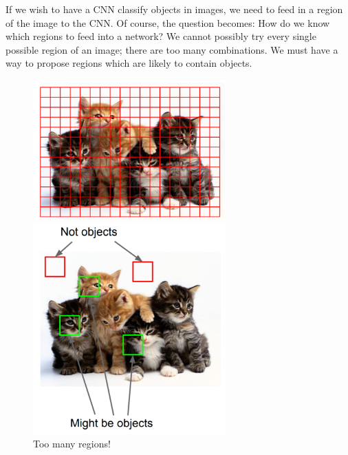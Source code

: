 \documentclass{article}
\begin{document}
If we wish to have a CNN classify objects in images, we need to feed in a region of the image to the CNN. Of course, the question becomes: How do we know which regions to feed into a network? We cannot possibly try every single possible region of an image; there are too many combinations. We must have a way to propose regions which are likely to contain objects.

\begin{figure}[htbp]
    \centering
    \begin{minipage}{0.45\textwidth}
        \centering
        \includegraphics[width=0.66\textwidth]{search.PNG} %
        \caption{Too many regions!}
    \end{minipage}\hfill
    \begin{minipage}{0.45\textwidth}
        \centering
        \includegraphics[width=0.66\textwidth]{region.PNG} %
    \end{minipage}
\end{figure}
\end{document}

